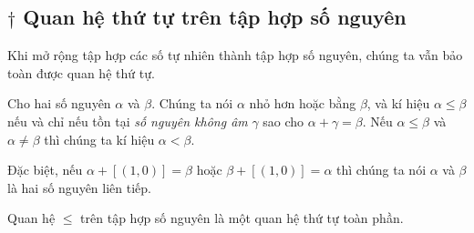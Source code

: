\subsection*{$\dagger$ Quan hệ thứ tự trên tập hợp số nguyên}

Khi mở rộng tập hợp các số tự nhiên thành tập hợp số nguyên, chúng ta vẫn bảo toàn được quan hệ thứ tự.

\begin{definition}
	Cho hai số nguyên $\alpha$ và $\beta$. Chúng ta nói $\alpha$ nhỏ hơn hoặc bằng $\beta$, và kí hiệu $\alpha\leq \beta$ nếu và chỉ nếu tồn tại \textit{số nguyên không âm} $\gamma$ sao cho $\alpha + \gamma = \beta$. Nếu $\alpha\leq \beta$ và $\alpha\ne \beta$ thì chúng ta kí hiệu $\alpha < \beta$.

	Đặc biệt, nếu $\alpha + [(1, 0)] = \beta$ hoặc $\beta + [(1, 0)] = \alpha$ thì chúng ta nói $\alpha$ và $\beta$ là hai số nguyên liên tiếp.
\end{definition}

\begin{theorem}
	Quan hệ $\leq$ trên tập hợp số nguyên là một quan hệ thứ tự toàn phần.
\end{theorem}

